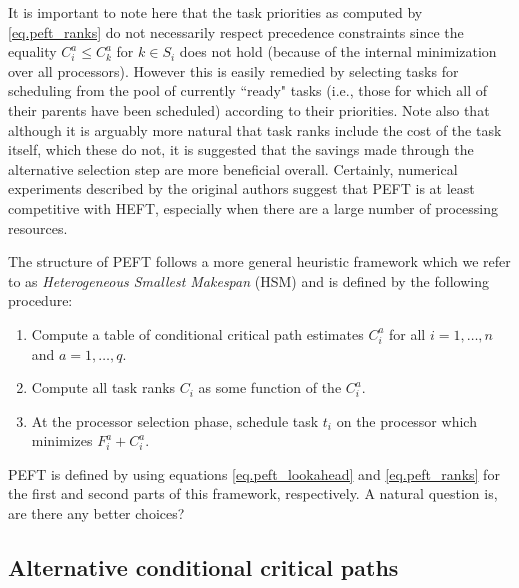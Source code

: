 \documentclass[12pt]{article}
\begin{document}
It is important to note here that the task priorities as computed by \eqref{eq.peft_ranks} do not necessarily respect precedence constraints since the equality $C_i^a \leq C_k^a$ for $k \in S_i$ does not hold (because of the internal minimization over all processors). However this is easily remedied by selecting tasks for scheduling from the pool of currently ``ready" tasks (i.e., those for which all of their parents have been scheduled) according to their priorities. Note also that although it is arguably more natural that task ranks include the cost of the task itself, which these do not, it is suggested that the savings made through the alternative selection step are more beneficial overall. Certainly, numerical experiments described by the original authors \cite{arabnejad14} suggest that PEFT is at least competitive with HEFT, especially when there are a large number of processing resources. 

The structure of PEFT follows a more general heuristic framework which we refer to as {\em Heterogeneous Smallest Makespan} (HSM) and is defined by the following procedure:
 \begin{enumerate}
 	\item Compute a table of conditional critical path estimates $C_i^a$ for all $i = 1, \dots, n$ and $a = 1, \dots, q$.
 	\item Compute all task ranks $C_i$ as some function of the $C_i^a$.
 	\item At the processor selection phase, schedule task $t_i$ on the processor which minimizes $F_i^a + C_i^a$.
 \end{enumerate}
PEFT is defined by using equations \eqref{eq.peft_lookahead} and \eqref{eq.peft_ranks} for the first and second parts of this framework, respectively. A natural question is, are there any better choices? 

\subsection{Alternative conditional critical paths}
\label{subsect.alt_cond_cp}
\end{document}

